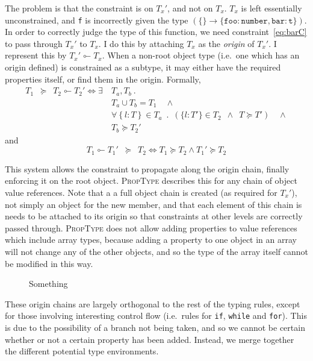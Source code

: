 \documentclass[12pt,a4paper,twoside,openright]{report}
\newcommand*{\orig}{\ensuremath{\!\multimapinv\!}}
\begin{document}
The problem is that the constraint is on $T_x'$, and not on $T_x$. $T_x$ is
left essentially unconstrained, and \texttt{f} is incorrectly given the type
$\mathtt{(\{\} \rightarrow \mathtt{\{foo:number, bar:t\}})}$. In order to
correctly judge the type of this function, we need constraint~\eqref{eq:barC}
to pass through $T_x'$ to $T_x$. I do this by attaching $T_x$ as the
\textit{origin} of $T_x'$. I represent this by $T_x'\orig T_x$.  When a
non-root object type (i.e.~one which has an origin defined) is constrained as a
subtype, it may either have the required properties itself, or find them in the
origin. Formally,
\begin{equation}
  \begin{split}
	T_1\enspace \succeq\enspace T_2\orig T_2' \iff  \exists\ & T_a, T_b\ .\\
	& T_a\cup T_b = T_1 \quad\land  \\
	& \forall \left\{l: T\right\} \in T_a \enspace.\enspace (\{l: T'\}\in T_2\enspace \land \enspace T \succeq T') \quad\land \\
	& T_b \succeq T_2'
  \end{split}
\end{equation}
and
\begin{equation}
  T_1\orig T_1'\enspace \succeq \enspace T_2 \iff T_1\succeq T_2 \land T_1' \succeq T_2
\end{equation}

This system allows the constraint to propagate along the origin chain, finally
enforcing it on the root object. \textsc{PropType} describes this for any chain of
object value references. Note that a a full object chain is created (as
required for $T_x'$), not simply an object for the new member, and that each
element of this chain is needs to be attached to its origin so that constraints
at other levels are correctly passed through. \textsc{PropType} does not allow adding
properties to value references which include array types, because adding a
property to one object in an array will not change any of the other objects,
and so the type of the array itself cannot be modified in this way.
\begin{figure}
\begin{center}
\end{center}
\caption{Something}
\label{fig:origin}
\end{figure}

These origin chains are largely orthogonal to the rest of the typing rules,
except for those involving interesting control flow (i.e.~rules for
\texttt{if}, \texttt{while} and \texttt{for}). This is due to the possibility
of a branch not being taken, and so we cannot be certain whether or not a
certain property has been added. Instead, we merge together the different
potential type environments. 
\end{document}
